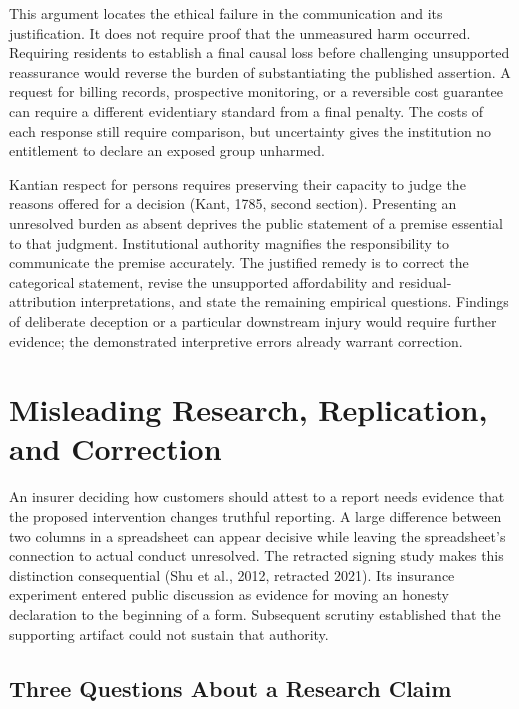 This argument locates the ethical failure in the communication and its
justification. It does not require proof that the unmeasured harm
occurred. Requiring residents to establish a final causal loss before
challenging unsupported reassurance would reverse the burden of
substantiating the published assertion. A request for billing records,
prospective monitoring, or a reversible cost guarantee can require a
different evidentiary standard from a final penalty. The costs of each
response still require comparison, but uncertainty gives the institution
no entitlement to declare an exposed group unharmed.

Kantian respect for persons requires preserving their capacity to judge
the reasons offered for a decision (Kant, 1785, second section).
Presenting an unresolved burden as absent deprives the public statement
of a premise essential to that judgment. Institutional authority
magnifies the responsibility to communicate the premise accurately. The
justified remedy is to correct the categorical statement, revise the
unsupported affordability and residual-attribution interpretations, and
state the remaining empirical questions. Findings of deliberate
deception or a particular downstream injury would require further
evidence; the demonstrated interpretive errors already warrant
correction.


\hypertarget{M09-misleading-research-replication-and-correction}{%
\section{Misleading Research, Replication, and
Correction}\label{M09-misleading-research-replication-and-correction}}

\noindent \noindent An insurer deciding how customers should attest to a report
needs evidence that the proposed intervention changes truthful
reporting. A large difference between two columns in a spreadsheet can
appear decisive while leaving the spreadsheet's connection to actual
conduct unresolved. The retracted signing study makes this distinction
consequential (Shu et al., 2012, retracted 2021). Its insurance
experiment entered public discussion as evidence for moving an honesty
declaration to the beginning of a form. Subsequent scrutiny established
that the supporting artifact could not sustain that authority.

\hypertarget{M09-three-questions-about-a-research-claim}{%
\subsection{Three Questions About a Research
Claim}\label{M09-three-questions-about-a-research-claim}}

